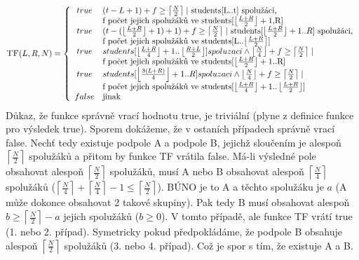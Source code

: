 \documentclass[12pt]{article}
\newcommand{\ceil}[2]{\left\lceil\frac{#1}{#2}\right\rceil}
\newcommand{\floor}[2]{\left\lfloor\frac{#1}{#2}\right\rfloor}
\begin{document}
\begin{equation*}
\textsc{TF}(L,R,N) = \left\{
	\begin{array}{cl}
	true & \text{$(t-L+1)+f \geq \left\lceil\frac{N}{2}\right\rceil \mid$
	students[L..t] spolužáci,} \\ 
	& \text{f počet jejich spolužáků ve
	students[$\left\lfloor\frac{L+R}{2}\right\rfloor+1$,R]}\\

	true & \text{$(t-(\floor{L+R}{2}+1)+1)+f \geq \left\lceil\frac{N}{2}\right\rceil \mid$
	students[$\floor{L+R}{2}+1..R$] spolužáci,} \\ 
	& \text{f počet jejich spolužáků ve
	students[L..$\left\lfloor\frac{L+R}{2}\right\rfloor$]}\\

	true &
	\text{$students[\left\lfloor\frac{L+R}{4}\right\rfloor+1..\floor{R+L}{2}]
	spoluzaci \wedge \floor{N}{4}+f \geq \left\lceil\frac{N}{2}\right\rceil \mid$}\\
	& \text{f počet jejich spolužáků ve
	students[$\left\lfloor\frac{L+R}{2}\right\rfloor+1$..R]}\\

	true & \text{$students[\left\lfloor\frac{3(L+R)}{4}\right\rfloor+1..R]
	spoluzaci \wedge \floor{N}{4}+f \geq \left\lceil\frac{N}{2}\right\rceil \mid$}\\
	& \text{f počet jejich spolužáků ve
	students[$\left\lfloor\frac{L+R}{4}\right\rfloor+1..\floor{L+R}{2}$]}\\

	false & \text{jinak}
	\end{array} \right.
\end{equation*}
Důkaz, že funkce správně vrací hodnotu true, je triviální (plyne z definice
funkce pro výsledek true). Sporem dokážeme, že v ostaních případech správně
vrací false. Nechť tedy existuje podpole A a podpole B, jejichž sloučením je
alespoň $\ceil{N}{2}$ spolužáků a přitom by funkce TF vrátila false. Má-li
výsledné pole obsahovat alespoň $\ceil{N}{2}$ spolužáků, musí A nebo B obsahovat
alespoň $\ceil{N}{4}$ spolužáků ($\ceil{N}{4}+\ceil{N}{4}-1\leq\ceil{N}{2}$).
BÚNO je to A a těchto spolužáku je $a$ (A může dokonce obsahovat 2 takové
skupiny). Pak tedy B musí obsahovat alespoň $b \geq
\ceil{N}{2}-a$ jejich spolužáků ($b \geq 0$). V tomto případě, ale funkce TF
vrátí true (1. nebo 2. případ). Symetricky pokud předpokládáme, že podpole B
obsahuje alespoň $\ceil{N}{2}$ spolužáků (3. nebo 4. případ). Což je
spor s tím, že existuje A a B.
\end{document}
